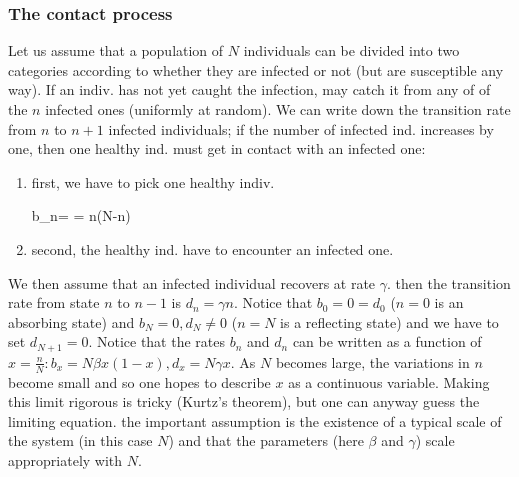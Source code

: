 \subsubsection*{The contact process}
Let us assume that a population of $N$ individuals can be divided into two categories according to whether they are infected or not (but are susceptible any way). If an indiv. has not yet caught the infection, may catch it from any of of the $n$ infected ones (uniformly at random).
We can write down the transition rate from $n$ to $n+1$ infected individuals; if the number of infected ind. increases by one, then one healthy ind. must get in contact with an infected one:
\begin{enumerate}
    \item first, we have to pick one healthy indiv.
    \begin{DispWithArrows}
        b_{n}=\tilde{\beta}  = n(N-n)
    \end{DispWithArrows}
    \item second, the healthy ind. have to encounter an infected one.
\end{enumerate}
We then assume that an infected individual recovers at rate $\gamma$. then the transition rate from state $n$ to $n-1$ is $d_{n}=\gamma n$. Notice that $b_{0}=0=d_{0}$ ($n=0$ is an absorbing state) and $b_{N}=0, d_{N} \neq 0$ ($n=N$ is a reflecting state) and we have to set $d_{N+1}=0$.
Notice that the rates $b_{n}$ and $d_{n}$ can be written as a function of $x=\frac{n}{N}: b_{x}=N \beta x(1-x), d_{x}=N \gamma x$.
As $N$ becomes large, the variations in $n$ become small and so one hopes to describe $x$ as a continuous variable. Making this limit rigorous is tricky (Kurtz's theorem), but one can anyway guess the limiting equation. the important assumption is the existence of a typical scale of the system (in this case $N$) and that the parameters (here $\beta$ and $\gamma$) scale appropriately with $N$.

